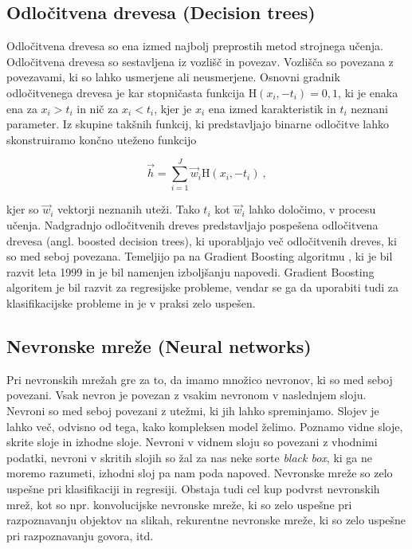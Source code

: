 \documentclass[a4paper]{article}
\begin{document}
\subsection{Odločitvena drevesa (Decision trees)}
Odločitvena drevesa so ena izmed najbolj preprostih metod strojnega učenja. Odločitvena drevesa so sestavljena iz
vozlišč in povezav. Vozlišča so povezana z povezavami, ki so lahko usmerjene ali neusmerjene. Osnovni gradnik
odločitvenega drevesa je kar stopničasta funkcija $\mathrm{H}(x_i,-t_i) = 0,1$, ki je enaka ena za $x_i > t_i$ in
nič za $x_i < t_i$, kjer je $x_i$ ena izmed karakteristik in $t_i$ neznani parameter. Iz skupine takšnih funkcij,
ki predstavljajo binarne odločitve lahko skonstruiramo končno uteženo funkcijo 

\begin{equation}
    \vec{h} = \sum_{i=1}^J{\vec{w}_i \mathrm{H}(x_i, -t_i)}\>,
\end{equation}

kjer so $\vec{w}_i$ vektorji neznanih uteži. Tako $t_i$ kot $\vec{w}_i$ lahko določimo, v procesu učenja. 
Nadgradnjo odločitvenih dreves predstavljajo pospešena odločitvena drevesa (angl. boosted decision trees), ki uporabljajo
več odločitvenih dreves, ki so med seboj povezana. Temeljijo pa na Gradient Boosting algoritmu \cite{Friedman_2001}, ki je 
bil razvit leta 1999 in je bil namenjen izboljšanju napovedi. Gradient Boosting algoritem je bil razvit za regresijske 
probleme, vendar se ga da uporabiti tudi za klasifikacijske probleme in je v praksi zelo uspešen. \\

\subsection{Nevronske mreže (Neural networks)}
Pri nevronskih mrežah gre za to, da imamo množico nevronov, ki so med seboj povezani. Vsak nevron je povezan z vsakim 
nevronom v naslednjem sloju. Nevroni so med seboj povezani z utežmi, ki jih lahko spreminjamo. Slojev je lahko več,
odvisno od tega, kako kompleksen model želimo. Poznamo vidne sloje, skrite sloje in izhodne sloje. Nevroni v vidnem
sloju so povezani z vhodnimi podatki, nevroni v skritih slojih so žal za nas neke sorte \textit{black box}, ki ga
ne moremo razumeti, izhodni sloj pa nam poda napoved. Nevronske mreže so zelo uspešne pri klasifikaciji in regresiji. 
Obstaja tudi cel kup podvrst nevronskih mrež, kot so npr. konvolucijske nevronske mreže, ki so zelo uspešne pri
razpoznavanju objektov na slikah, rekurentne nevronske mreže, ki so zelo uspešne pri razpoznavanju govora, itd.\\
\end{document}
